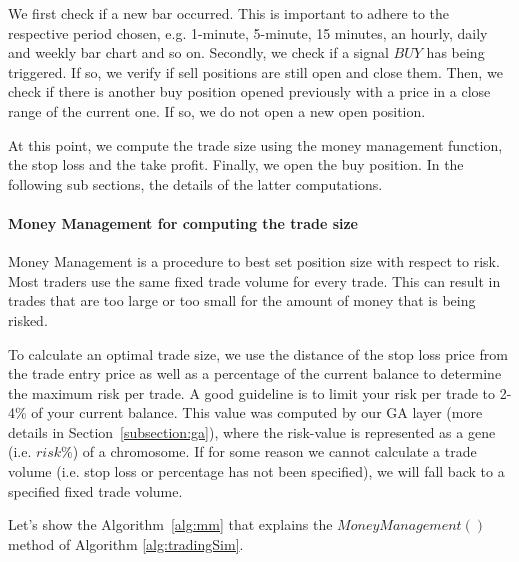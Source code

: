 We first check if a new bar occurred. This is important to adhere to the respective period chosen, e.g. 1-minute,  5-minute, 15 minutes, an hourly, daily and weekly bar chart and so on.
Secondly, we check if a signal $BUY$ has being triggered. If so, we verify if sell positions are still open and close them. Then, we check if there is another buy position opened previously with a price in a close range of the current one. If so, we do not open a new open position.

\noindent At this point, we compute the trade size using the money management function, the stop loss and the take profit. Finally, we open the buy position. In the following sub sections, the details of the latter computations. 

\paragraph{\textbf{Money Management for computing the trade size}}\mbox{}

Money Management is a procedure to best set position size with respect to risk. Most traders use the same fixed trade volume for every trade. This can result in trades that are too large or too small for the amount of money that is being risked.

To calculate an optimal trade size, we use the distance of the stop loss price from the trade entry price as well as a percentage of the current balance to determine the maximum risk per trade. A good guideline is to limit your risk per trade to 2-4\% of your current balance. This value was computed by our GA layer (more details in Section~\ref{subsection:ga}), where the risk-value is represented as a gene (i.e. $risk\%$) of a chromosome. If for some reason we cannot calculate a trade volume (i.e. stop loss or percentage has not been specified), we will fall back to a specified fixed trade volume.

Let's show the Algorithm~\ref{alg:mm} that explains the $MoneyManagement()$ method of Algorithm \ref{alg:tradingSim}. 

